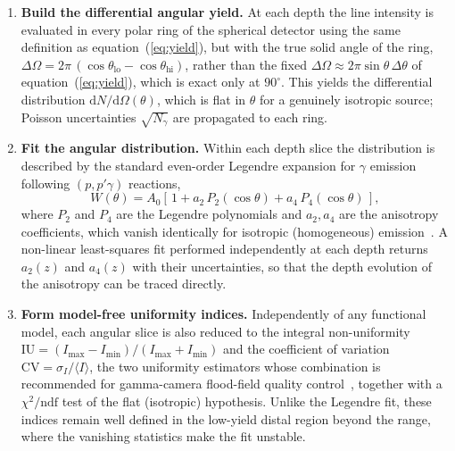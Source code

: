 \documentclass[a4paper]{article}
\begin{document}
\begin{enumerate}
    \item \textbf{Build the differential angular yield.} At each depth the line intensity is evaluated in every polar ring of the spherical detector using the same definition as equation~(\ref{eq:yield}), but with the true solid angle of the ring, $\Delta\Omega = 2\pi\,(\cos\theta_\mathrm{lo} - \cos\theta_\mathrm{hi})$, rather than the fixed $\Delta\Omega \approx 2\pi\sin\theta\,\Delta\theta$ of equation~(\ref{eq:yield}), which is exact only at $90^\circ$. This yields the differential distribution $\mathrm{d}N/\mathrm{d}\Omega(\theta)$, which is flat in $\theta$ for a genuinely isotropic source; Poisson uncertainties $\sqrt{N_\gamma}$ are propagated to each ring.
    \item \textbf{Fit the angular distribution.} Within each depth slice the distribution is described by the standard even-order Legendre expansion for $\gamma$ emission following $(p,p'\gamma)$ reactions,
    \begin{equation}
        W(\theta) = A_0\left[\,1 + a_2\,P_2(\cos\theta) + a_4\,P_4(\cos\theta)\,\right],
        \label{eq:legendre}
    \end{equation}
    where $P_2$ and $P_4$ are the Legendre polynomials and $a_2, a_4$ are the anisotropy coefficients, which vanish identically for isotropic (homogeneous) emission~\cite{kiener1998,onecha2024}. A non-linear least-squares fit performed independently at each depth returns $a_2(z)$ and $a_4(z)$ with their uncertainties, so that the depth evolution of the anisotropy can be traced directly.
    \item \textbf{Form model-free uniformity indices.} Independently of any functional model, each angular slice is also reduced to the integral non-uniformity $\mathrm{IU} = (I_\mathrm{max} - I_\mathrm{min})/(I_\mathrm{max} + I_\mathrm{min})$ and the coefficient of variation $\mathrm{CV} = \sigma_I/\langle I\rangle$, the two uniformity estimators whose combination is recommended for gamma-camera flood-field quality control~\cite{murray2014}, together with a $\chi^2/\mathrm{ndf}$ test of the flat (isotropic) hypothesis. Unlike the Legendre fit, these indices remain well defined in the low-yield distal region beyond the range, where the vanishing statistics make the fit unstable.
\end{enumerate}
\end{document}
